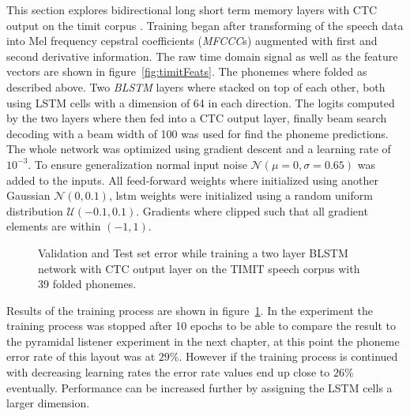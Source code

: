 This section explores bidirectional long short term memory layers with CTC output on the timit corpus \cite{Graves2012, Graves2006}. Training began after transforming of the speech data into Mel frequency cepstral coefficients (\textit{MFCCC}s) augmented with first and second derivative information. The raw time domain signal as well as the feature vectors are shown in figure~\ref{fig:timitFeats}. The phonemes where folded as described above. Two \textit{BLSTM} layers where stacked on top of each other, both using LSTM cells with a dimension of 64 in each direction. The logits computed by the two layers where then fed into a CTC output layer, finally beam search decoding with a beam width of 100 was used for find the phoneme predictions. The whole network was optimized using gradient descent and a learning rate of $10^{-3}$. To ensure generalization normal input noise $\mathcal{N}(\mu = 0,\sigma = 0.65)$ was added to the inputs. All feed-forward weights where initialized using another Gaussian $\mathcal{N}(0, 0.1)$, lstm weights were initialized using a random uniform distribution $\mathcal{U}(-0.1, 0.1)$. Gradients where clipped such that all gradient elements are within $(-1,1)$.
\begin{figure}
\centering


\caption{Validation and Test set error while training a two layer BLSTM network with CTC output layer on the TIMIT speech corpus with 39 folded phonemes.}
\label{fig:ctc2BLSTM41}
\end{figure}
Results of the training process are shown in figure~\ref*{fig:ctc2BLSTM41}. In the experiment the training process was stopped after 10 epochs to be able to compare the result to the pyramidal listener experiment in the next chapter, at this point the phoneme error rate of this layout was at $29\%$. However if the training process is continued with decreasing learning rates the error rate values end up close to $26\%$ eventually. Performance can be increased further by assigning the LSTM cells a larger dimension.











